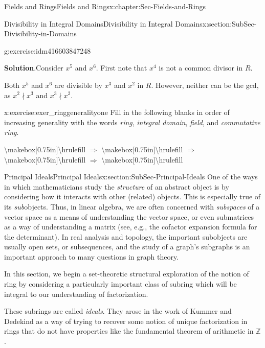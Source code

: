 \documentclass[oneside,10pt,]{book}
\numberwithin{equation}{section}
\def\Z{{\mathbb Z}}
\begin{document}
\begin{chapterptx}{Fields and Rings}{}{Fields and Rings}{}{}{x:chapter:Sec-Fields-and-Rings}
\begin{sectionptx}{Divisibility in Integral Domains}{}{Divisibility in Integral Domains}{}{}{x:section:SubSec-Divisibility-in-Domains}
\begin{inlineexercise}{}{g:exercise:idm416603847248}
\par\smallskip%
\noindent\textbf{Solution}.\hypertarget{g:solution:idm416603845280}{}\quad{}Consider \(x^5\) and \(x^6\). First note that \(x^4\) is not a common divisor in \(R\).%
\par
Both \(x^5\) and \(x^6\) are divisible by \(x^3\) and \(x^2\) in \(R\). However, neither can be the gcd, as \(x^2\nmid x^3\) and \(x^3\nmid x^2\).%
\end{inlineexercise}
\begin{inlineexercise}{}{x:exercise:exer_ringgeneralityone}%
Fill in the following blanks in order of increasing generality with the words \emph{ring}, \emph{integral domain}, \emph{field}, and \emph{commutative ring}.%
\par
\textbackslash{}makebox[0.75in]\textbraceleft{}\textbackslash{}hrulefill\textbraceright{} \(\Rightarrow\) \textbackslash{}makebox[0.75in]\textbraceleft{}\textbackslash{}hrulefill\textbraceright{} \(\Rightarrow\) \textbackslash{}makebox[0.75in]\textbraceleft{}\textbackslash{}hrulefill\textbraceright{} \(\Rightarrow\) \textbackslash{}makebox[0.75in]\textbraceleft{}\textbackslash{}hrulefill\textbraceright{}%
\end{inlineexercise}
\end{sectionptx}
%
%
\typeout{************************************************}
\typeout{************************************************}
%
\begin{sectionptx}{Principal Ideals}{}{Principal Ideals}{}{}{x:section:SubSec-Principal-Ideals}
One of the ways in which mathematicians study the \emph{structure} of an abstract object is by considering how it interacts with other (related) objects. This is especially true of its \emph{sub}objects. Thus, in linear algebra, we are often concerned with \emph{subspaces} of a vector space as a means of understanding the vector space, or even submatrices as a way of understanding a matrix (see, e.g., the cofactor expansion formula for the determinant). In real analysis and topology, the important subobjects are usually open sets, or subsequences, and the study of a graph's subgraphs is an important approach to many questions in graph theory.%
\par
In this section, we begin a set-theoretic structural exploration of the notion of ring by considering a particularly important class of subring which will be integral to our understanding of factorization.%
\par
These subrings are called \emph{ideals}. They arose in the work of Kummer and Dedekind as a way of trying to recover some notion of unique factorization in rings that do not have properties like the fundamental theorem of arithmetic in \(\Z\).%

\end{sectionptx}
\end{chapterptx}
\end{document}
